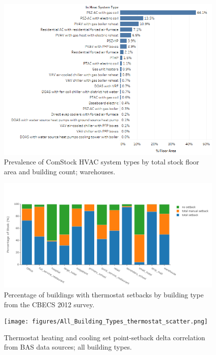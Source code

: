 \begin{figure}
    \centering \includegraphics[width=1.0\textwidth]{figures/HVAC_SYS_Type_PREV_Warehouse.png}
    \caption[HVAC system type prevalence in warehouses]{Prevalence of ComStock HVAC system types by total stock floor area and building count; warehouses.}
    \label{fig:hvac_sys_type_prevalence_warehouse}
\end{figure}

\begin{figure}
    \centering \includegraphics[width=1.0\textwidth]{figures/cbecs_therm_summary.png}
    \caption[Percentage of buildings with thermostat setbacks from the CBECS 2012 survey]{Percentage of buildings with thermostat setbacks by building type from the CBECS 2012 survey.}
    \label{fig:cbecs_therm_setback_summary}
\end{figure}

\begin{figure}
    \centering \texttt{[image: figures/All\_Building\_Types\_thermostat\_scatter.png]}
    \caption[Correlation between thermostat set point and thermostat setback from BAS data]{Thermostat heating and cooling set point-setback delta correlation from BAS data sources; all building types.}
    \label{fig:therm_setpoint_setback}
\end{figure}

